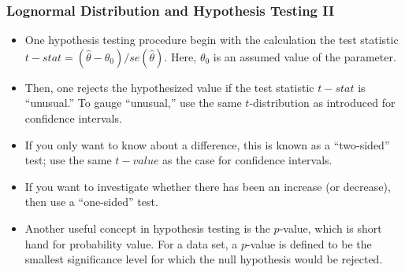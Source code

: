 \documentclass{beamer}
\begin{document}
\begin{frame}[shrink=2]
\frametitle{Lognormal Distribution and Hypothesis Testing II}
\begin{itemize}
\item One hypothesis testing procedure begin with the calculation the test statistic $ t-stat=(\hat{\theta}-\theta_0)/se(\hat{\theta})$. Here, $\theta_0$ is an assumed value of the parameter.
\item Then, one rejects the hypothesized value if the test statistic $t-stat$ is ``unusual.'' To gauge ``unusual,'' use the same $t$-distribution as introduced for confidence intervals.
\item If you only want to know about a difference, this is known as a ``two-sided'' test; use the same $t-value$ as the case for confidence intervals.
\item If you want to investigate whether there has been an increase (or decrease), then use a ``one-sided'' test.
\item Another useful concept in hypothesis testing is the $p$-value, which is short hand for probability value. For a data set, a $p$-value is defined to be the smallest significance level for which the null hypothesis would be rejected.
\end{itemize}
\end{frame}
\end{document}
